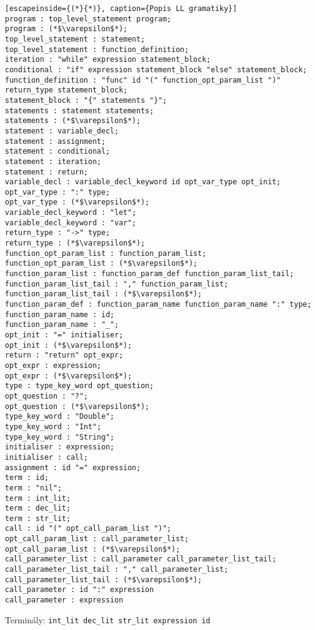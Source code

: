 \begin{lstlisting}[escapeinside={(*}{*)}, caption={Popis LL gramatiky}]
program : top_level_statement program;
program : (*$\varepsilon$*);
top_level_statement : statement;
top_level_statement : function_definition;
iteration : "while" expression statement_block;
conditional : "if" expression statement_block "else" statement_block;
function_definition : "func" id "(" function_opt_param_list ")" return_type statement_block;
statement_block : "{" statements "}";
statements : statement statements;
statements : (*$\varepsilon$*);
statement : variable_decl;
statement : assignment;
statement : conditional;
statement : iteration;
statement : return;
variable_decl : variable_decl_keyword id opt_var_type opt_init;
opt_var_type : ":" type;
opt_var_type : (*$\varepsilon$*);
variable_decl_keyword : "let";
variable_decl_keyword : "var";
return_type : "->" type;
return_type : (*$\varepsilon$*);
function_opt_param_list : function_param_list;
function_opt_param_list : (*$\varepsilon$*);
function_param_list : function_param_def function_param_list_tail;
function_param_list_tail : "," function_param_list;
function_param_list_tail : (*$\varepsilon$*);
function_param_def : function_param_name function_param_name ":" type;
function_param_name : id;
function_param_name : "_";
opt_init : "=" initialiser;
opt_init : (*$\varepsilon$*);
return : "return" opt_expr;
opt_expr : expression;
opt_expr : (*$\varepsilon$*);
type : type_key_word opt_question;
opt_question : "?";
opt_question : (*$\varepsilon$*);
type_key_word : "Double";
type_key_word : "Int";
type_key_word : "String";
initialiser : expression;
initialiser : call;
assignment : id "=" expression;
term : id;
term : "nil";
term : int_lit;
term : dec_lit;
term : str_lit;
call : id "(" opt_call_param_list ")";
opt_call_param_list : call_parameter_list;
opt_call_param_list : (*$\varepsilon$*);
call_parameter_list : call_parameter call_parameter_list_tail;
call_parameter_list_tail : "," call_parameter_list;
call_parameter_list_tail : (*$\varepsilon$*);
call_parameter : id ":" expression
call_parameter : expression
\end{lstlisting}
\noindent Terminály: \lstinline{int_lit dec_lit str_lit expression id}
